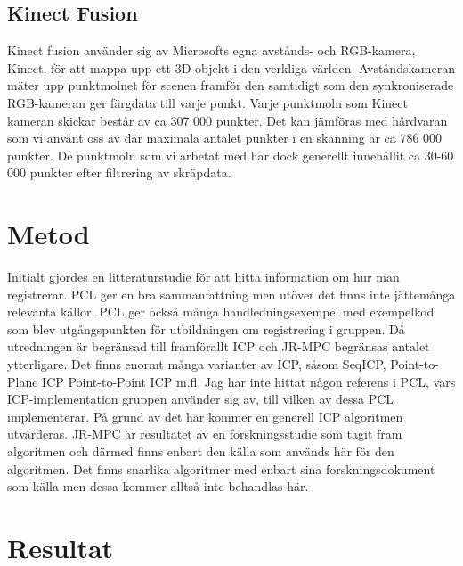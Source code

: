 \subsection{Kinect Fusion}

Kinect fusion använder sig av Microsofts egna avstånds- och RGB-kamera, Kinect, för att mappa upp ett 3D objekt i den verkliga världen. Avståndskameran mäter upp punktmolnet för scenen framför den samtidigt som den synkroniserade RGB-kameran ger färgdata till varje punkt. 
Varje punktmoln som Kinect kameran skickar består av ca 307 000 punkter. Det kan jämföras med hårdvaran som vi använt oss av där maximala antalet punkter i en skanning är ca 786 000 punkter. De punktmoln som vi arbetat med har dock generellt innehållit ca 30-60 000 punkter efter filtrering av skräpdata.

\section{Metod}
\label{sec:method-karlsson}

Initialt gjordes en litteraturstudie för att hitta information om hur man registrerar. PCL ger en bra sammanfattning men utöver det finns inte jättemånga relevanta källor. PCL ger också många handledningsexempel med exempelkod som blev utgångspunkten för utbildningen om registrering i gruppen. Då utredningen är begränsad till framförallt ICP och JR-MPC begränsas antalet ytterligare. Det finns enormt många varianter av ICP, såsom SeqICP, Point-to-Plane ICP Point-to-Point ICP m.fl. Jag har inte hittat någon referens i PCL, vars ICP-implementation gruppen använder sig av, till vilken av dessa PCL implementerar. På grund av det här kommer en generell ICP algoritmen utvärderas. JR-MPC är resultatet av en forskningsstudie som tagit fram algoritmen och därmed finns enbart den källa som används här för den algoritmen. Det finns snarlika algoritmer med enbart sina forskningsdokument som källa men dessa kommer alltså inte behandlas här.



\section{Resultat}
\label{sec:results-karlsson}

